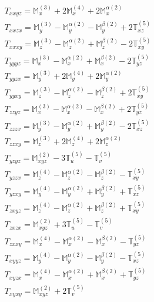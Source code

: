 \documentclass[fleqn,8pt,landscape]{jsarticle}
\begin{document}
\begin{align*}
& T_{xxyz} = \mathbb{M}_{x}^{(3)} + 2 \mathbb{M}_{x}^{(4)} + 2 \mathbb{M}_{x}^{\alpha(2)} \\
& T_{xxzx} = \mathbb{M}_{y}^{(3)} - \mathbb{M}_{y}^{\alpha(2)} - \mathbb{M}_{y}^{\beta(2)} + 2 \mathbb{T}_{xz}^{(5)} \\
& T_{xxxy} = \mathbb{M}_{z}^{(3)} - \mathbb{M}_{z}^{\alpha(2)} + \mathbb{M}_{z}^{\beta(2)} - 2 \mathbb{T}_{xy}^{(5)} \\
& T_{yyyz} = \mathbb{M}_{x}^{(3)} - \mathbb{M}_{x}^{\alpha(2)} + \mathbb{M}_{x}^{\beta(2)} - 2 \mathbb{T}_{yz}^{(5)} \\
& T_{yyzx} = \mathbb{M}_{y}^{(3)} + 2 \mathbb{M}_{y}^{(4)} + 2 \mathbb{M}_{y}^{\alpha(2)} \\
& T_{yyxy} = \mathbb{M}_{z}^{(3)} - \mathbb{M}_{z}^{\alpha(2)} - \mathbb{M}_{z}^{\beta(2)} + 2 \mathbb{T}_{xy}^{(5)} \\
& T_{zzyz} = \mathbb{M}_{x}^{(3)} - \mathbb{M}_{x}^{\alpha(2)} - \mathbb{M}_{x}^{\beta(2)} + 2 \mathbb{T}_{yz}^{(5)} \\
& T_{zzzx} = \mathbb{M}_{y}^{(3)} - \mathbb{M}_{y}^{\alpha(2)} + \mathbb{M}_{y}^{\beta(2)} - 2 \mathbb{T}_{xz}^{(5)} \\
& T_{zzxy} = \mathbb{M}_{z}^{(3)} + 2 \mathbb{M}_{z}^{(4)} + 2 \mathbb{M}_{z}^{\alpha(2)} \\
& T_{yzyz} = \mathbb{M}_{xyz}^{(2)} - 3 \mathbb{T}_{u}^{(5)} - \mathbb{T}_{v}^{(5)} \\
& T_{yzzx} = \mathbb{M}_{z}^{(4)} - \mathbb{M}_{z}^{\alpha(2)} - \mathbb{M}_{z}^{\beta(2)} - \mathbb{T}_{xy}^{(5)} \\
& T_{yzxy} = \mathbb{M}_{y}^{(4)} - \mathbb{M}_{y}^{\alpha(2)} + \mathbb{M}_{y}^{\beta(2)} + \mathbb{T}_{xz}^{(5)} \\
& T_{zxyz} = \mathbb{M}_{z}^{(4)} - \mathbb{M}_{z}^{\alpha(2)} + \mathbb{M}_{z}^{\beta(2)} + \mathbb{T}_{xy}^{(5)} \\
& T_{zxzx} = \mathbb{M}_{xyz}^{(2)} + 3 \mathbb{T}_{u}^{(5)} - \mathbb{T}_{v}^{(5)} \\
& T_{zxxy} = \mathbb{M}_{x}^{(4)} - \mathbb{M}_{x}^{\alpha(2)} - \mathbb{M}_{x}^{\beta(2)} - \mathbb{T}_{yz}^{(5)} \\
& T_{xyyz} = \mathbb{M}_{y}^{(4)} - \mathbb{M}_{y}^{\alpha(2)} - \mathbb{M}_{y}^{\beta(2)} - \mathbb{T}_{xz}^{(5)} \\
& T_{xyzx} = \mathbb{M}_{x}^{(4)} - \mathbb{M}_{x}^{\alpha(2)} + \mathbb{M}_{x}^{\beta(2)} + \mathbb{T}_{yz}^{(5)} \\
& T_{xyxy} = \mathbb{M}_{xyz}^{(2)} + 2 \mathbb{T}_{v}^{(5)}
\end{align*}
\end{document}
